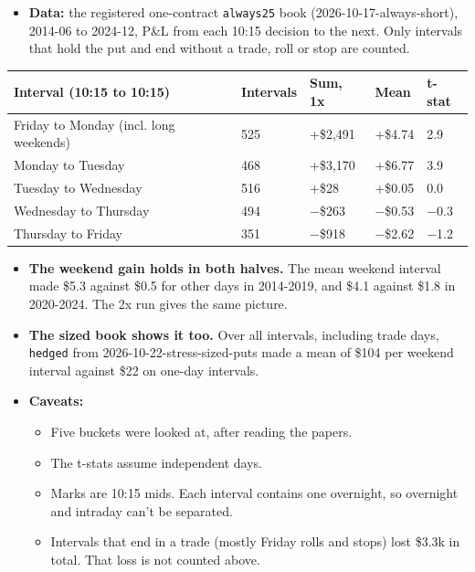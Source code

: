 \documentclass{article}
\begin{document}
\begin{itemize}

\item \textbf{Data:} the registered one-contract \texttt{always25} book (2026-10-17-always-short), 2014-06 to 2024-12, P\&L from each 10:15 decision to the next. Only intervals that hold the put and end without a trade, roll or stop are counted.

\end{itemize}

\begin{center}\small
\begin{tabularx}{\linewidth}{>{\raggedright\arraybackslash}X l l l l}
\toprule
\textbf{Interval (10:15 to 10:15)} & \textbf{Intervals} & \textbf{Sum, 1x} & \textbf{Mean} & \textbf{t-stat} \\
\midrule
Friday to Monday (incl. long weekends) & 525 & +\$2,491 & +\$4.74 & 2.9 \\
Monday to Tuesday & 468 & +\$3,170 & +\$6.77 & 3.9 \\
Tuesday to Wednesday & 516 & +\$28 & +\$0.05 & 0.0 \\
Wednesday to Thursday & 494 & \ensuremath{-}\$263 & \ensuremath{-}\$0.53 & \ensuremath{-}0.3 \\
Thursday to Friday & 351 & \ensuremath{-}\$918 & \ensuremath{-}\$2.62 & \ensuremath{-}1.2 \\
\bottomrule
\end{tabularx}
\end{center}

\begin{itemize}

\item \textbf{The weekend gain holds in both halves.} The mean weekend interval made \$5.3 against \$0.5 for other days in 2014-2019, and \$4.1 against \$1.8 in 2020-2024. The 2x run gives the same picture.

\item \textbf{The sized book shows it too.} Over all intervals, including trade days, \texttt{hedged} from 2026-10-22-stress-sized-puts made a mean of \$104 per weekend interval against \$22 on one-day intervals.

\item \textbf{Caveats:}

\begin{itemize}

\item Five buckets were looked at, after reading the papers.

\item The t-stats assume independent days.

\item Marks are 10:15 mids. Each interval contains one overnight, so overnight and intraday can't be separated.

\item Intervals that end in a trade (mostly Friday rolls and stops) lost \$3.3k in total. That loss is not counted above.

\end{itemize}

\end{itemize}
\end{document}
